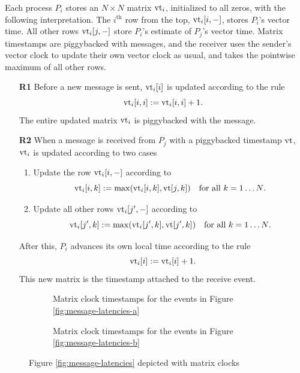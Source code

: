 \documentclass[]             %
{NASA}                       %
\theoremstyle{definition}
\begin{document}
Each process $P_i$ stores an $N\times{}N$ matrix $\textrm{vt}_i$, initialized to
all zeros, with the following interpretation. The $i^{\textrm{th}}$
row from the top, $\textrm{vt}_i[i, -]$, stores $P_i$'s vector time. All other
rows $\textrm{vt}_i[j,-]$ store $P_i$'s estimate of $P_j$'s vector
time. Matrix timestamps are piggybacked with messages, and the
receiver uses the sender's vector clock to update their own vector
clock as usual, and takes the pointwise maximum of all other rows.

\begin{enumerate}
\item[\textbf{R1}] Before a new message is sent, $\textrm{vt}_i[i]$ is updated according to the rule
  \[\textrm{vt}_i[i,i] := \textrm{vt}_i[i,i] + 1.\]
  The entire updated matrix $\textrm{vt}_i$ is piggybacked with the message.
\item[\textbf{R2}] When a message is received from $P_j$ with a piggybacked timestamp $\textrm{vt}$,
  $\textrm{vt}_i$ is updated according to two cases
  \begin{enumerate}
  \item Update the row $\textrm{vt}_i[i, -]$ according to
    \[\textrm{vt}_i[i, k] := \max(\textrm{vt}_i[i,k], \textrm{vt}[j, k]) \quad \textrm{for all $k = 1\ldots N$}.\]
  \item Update all other rows $\textrm{vt}_i[j', -]$ according to
    \[\textrm{vt}_i[j', k] := \max(\textrm{vt}_i[j',k], \textrm{vt}[j', k]) \quad \textrm{for all $k = 1\ldots N$}.\]
  \end{enumerate}
  After this, $P_i$ advances its own local time according to the rule
  \[ \textrm{vt}_i[i] := \textrm{vt}_i[i] + 1.\]
  This new matrix is the timestamp attached to the receive event.
\end{enumerate}

\begin{figure}[p]
  \begingroup
  \setlength\belowcaptionskip{4ex}
  \begin{subfigure}{1\textwidth}
    \caption{Matrix clock timestamps for the events in Figure \ref{fig:message-latencies-a}}
    \label{fig:message-latencies-matrix-a}
  \end{subfigure}
  \begin{subfigure}{1\textwidth}
    \caption{Matrix clock timestamps for the events in Figure \ref{fig:message-latencies-b}}
    \label{fig:message-latencies-matrix-b}
  \end{subfigure}
  \caption{Figure \ref{fig:message-latencies} depicted with matrix clocks}
  \label{fig:message-latencies-matrix}
  \endgroup
\end{figure}
\afterpage{\clearpage}
\end{document}
